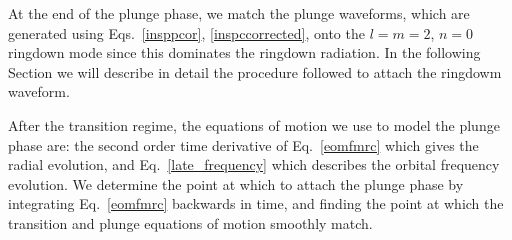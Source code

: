 At the end of the plunge phase, we match the plunge waveforms, which are generated using Eqs.~\eqref{insppcor}, \eqref{inspccorrected}, onto the \(l=m=2\), \(n=0\) ringdown mode since this dominates the ringdown radiation. In the following Section we will describe in detail the procedure followed to attach the ringdowm waveform. 

After the transition regime, the equations of motion we use to model the plunge phase are:  the second order time derivative of Eq.~\eqref{eomfmrc} which gives the radial evolution, and Eq.~\eqref{late_frequency} which describes the orbital frequency evolution. We determine the point at which to attach the plunge phase by integrating  Eq.~\eqref{eomfmrc} backwards in time, and finding the point at which the transition and plunge equations of motion smoothly match. 


